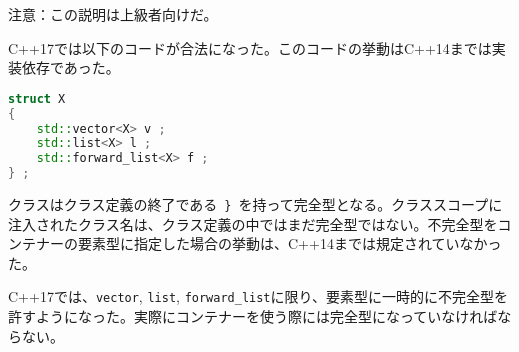 %

\noindent
\textsf{注意}：この説明は上級者向けだ。

C++17では以下のコードが合法になった。このコードの挙動はC++14までは実装依存であった。

\begin{lstlisting}[language=C++]
struct X
{
    std::vector<X> v ;
    std::list<X> l ;
    std::forward_list<X> f ;
} ;
\end{lstlisting}

クラスはクラス定義の終了である~\lstinline!}!~を持って完全型となる。クラススコープに注入されたクラス名は、クラス定義の中ではまだ完全型ではない。不完全型をコンテナーの要素型に指定した場合の挙動は、C++14までは規定されていなかった。

C++17では、\lstinline!vector!, \lstinline!list!,
\lstinline!forward_list!に限り、要素型に一時的に不完全型を許すようになった。実際にコンテナーを使う際には完全型になっていなければならない。
